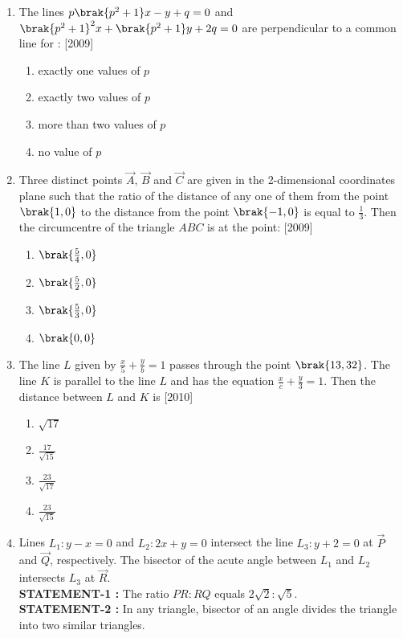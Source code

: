 \begin{enumerate}
\item The lines $p\brak{p^{2}+1}x-y+q=0$ and $\brak{p^{2}+1}^{2}x+\brak{p^{2}+1}y+ 2q=0$ are perpendicular to a common line for : \hfill{[2009]}
\begin{enumerate}
\item exactly one values of $p$
\item exactly two values of $p$ 
\item more than two values of $p$ 
\item no value of $p$ 
\end{enumerate}

\item Three distinct points $\vec{A}$, $\vec{B}$ and $\vec{C}$ are given in the 
2-dimensional coordinates plane such that the ratio of the 
distance of any one of them from the point $\brak{1, 0}$ to the distance from
the point $\brak{-1, 0}$ is equal to $\frac{1}{3}$. Then the circumcentre of the triangle $ABC$ is at the point: \hfill{[2009]}
\begin{multicols}{4}
\begin{enumerate}
\item $\brak{\frac{5}{4}, 0}$
\item $\brak{\frac{5}{2}, 0}$
\item $\brak{\frac{5}{3}, 0}$
\item $\brak{0, 0}$
\end{enumerate}
\end{multicols} 

\item The line $L$ given by $\frac{x}{5}+\frac{y}{b}=1$ passes through the point $\brak{13, 32}$. The line $K$ is parallel to the line $L$ and has the equation $\frac{x}{c}+\frac{y}{3}=1$. Then the distance between $L$ and $K$ is
\hfill{[2010]}
\begin{multicols}{4}
\begin{enumerate}
\item $\sqrt{17}$
\item $\frac{17}{\sqrt{15}}$
\item $\frac{23}{\sqrt{17}}$
\item $\frac{23}{\sqrt{15}}$
\end{enumerate}
\end{multicols} 

\item Lines $L_{1}: y-x=0$ and $L_{2}: 2x+y=0$ intersect the line $L_{3}: y+2=0$ at $\vec{P}$ and $\vec{Q}$, respectively. The bisector of the acute 
	angle between $L_{1}$ and $L_{2}$ intersects $L_{3}$ at $\vec{R}$.\\
\textbf{STATEMENT-1 :} The ratio $PR:RQ$ equals $2\sqrt{2}:\sqrt{5}$.\\
\textbf{STATEMENT-2 :} In any triangle, bisector of an angle divides the triangle into two similar triangles.


\end{enumerate}
